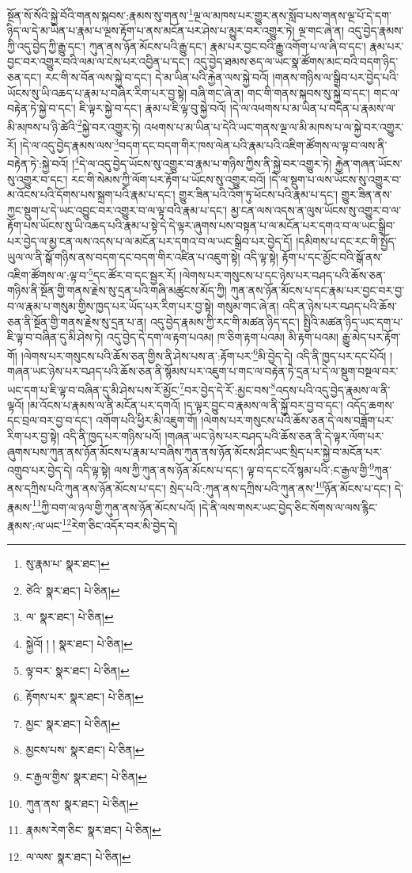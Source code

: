 སྔོན་སོ་སོའི་སྐྱེ་བོའི་གནས་སྐབས་:རྣམས་སུ་གནས་\footnote{སུ་རྣམ་པ་  སྣར་ཐང་། }ལྔ་ལ་མཁས་པར་གྱུར་ནས་སློབ་པས་གནས་ལྔ་པོ་དེ་དག་ཉིད་ལ་དེ་མ་ཡིན་པ་རྣམ་པ་ལྔས་རྟོག་པ་ནས་མངོན་པར་ཤེས་པ་མྱུར་བར་འགྱུར་ཏེ། ལྔ་གང་ཞེ་ན། འདུ་བྱེད་རྣམས་ཀྱི་འདུ་བྱེད་ཀྱི་རྒྱུ་དང་། ཀུན་ནས་ཉོན་མོངས་པའི་རྒྱུ་དང་། རྣམ་པར་བྱང་བའི་རྒྱུ་འགོག་པ་ལ་ཞི་བ་དང་། རྣམ་པར་བྱང་བར་འགྱུར་བའི་ལམ་ལ་ངེས་པར་འབྱིན་པ་དང་། འདུ་བྱེད་ཐམས་ཅད་ལ་ཡང་སྣ་ཚོགས་མང་བའི་བདག་ཉིད་ཅན་དང་། རང་གི་ས་བོན་ལས་སྐྱེ་བ་དང་། དེ་མ་ཡིན་པའི་རྐྱེན་ལས་སྐྱེ་བའོ། །གནས་གཉིས་ལ་སྒྲིབ་པར་བྱེད་པའི་ཡོངས་སུ་ཡི་འཆད་པ་རྣམ་པ་བཞིར་རིག་པར་བྱ་སྟེ། བཞི་གང་ཞེ་ན། གང་གི་གནས་སྐབས་སུ་སྐྱེ་བ་དང་། གང་ལ་བརྟེན་ཏེ་སྐྱེ་བ་དང་། ཇི་ལྟར་སྐྱེ་བ་དང་། རྣམ་པ་ཇི་ལྟ་བུ་སྐྱེ་བའོ། །དེ་ལ་འཕགས་པ་མ་ཡིན་པ་བདེན་པ་རྣམས་ལ་མི་མཁས་པ་ཉི་ཚེའི་\footnote{ཙེའི་  སྣར་ཐང་།  པེ་ཅིན། }སྐྱེ་བར་འགྱུར་ཏེ། འཕགས་པ་མ་ཡིན་པ་དེའི་ཡང་གནས་ལྔ་ལ་མི་མཁས་པ་ལ་སྐྱེ་བར་འགྱུར་རོ། །དེ་ལ་འདུ་བྱེད་རྣམས་ལས་\footnote{ལ་  སྣར་ཐང་།  པེ་ཅིན། }བདག་དང་བདག་གིར་ཁས་ལེན་པའི་རྣམ་པའི་འཇིག་ཚོགས་ལ་ལྟ་བ་ལས་ནི་བརྟེན་ཏེ་:སྐྱེ་བའོ། །\footnote{སྐྱེའོ། ། །  སྣར་ཐང་།  པེ་ཅིན། }དེ་ལ་འདུ་བྱེད་ཡོངས་སུ་འགྱུར་བ་རྣམ་པ་གཉིས་ཀྱིས་ནི་སྐྱེ་བར་འགྱུར་ཏེ། རྐྱེན་གཞན་ཡོངས་སུ་འགྱུར་བ་དང་། རང་གི་སེམས་ཀྱི་ལོག་པར་རྟོག་པ་ཡོངས་སུ་འགྱུར་བའོ། །དེ་ལ་སྡུག་པ་ལས་ཡོངས་སུ་འགྱུར་བ་མ་འོངས་པའི་དོགས་པས་སྐྲག་པའི་རྣམ་པ་དང་། གྱུར་ཟིན་པའི་འོག་ཏུ་ཕོངས་པའི་རྣམ་པ་དང་། གྱུར་ཟིན་ནས་ཀྱང་སྡུག་པ་དེ་ཡང་འབྱུང་བར་འགྱུར་བ་ལ་ལྟ་བའི་རྣམ་པ་དང་། མྱ་ངན་ལས་འདས་ན་ལུས་ཡོངས་སུ་འགྱུར་བ་ལ་རྟོག་པས་ཡོངས་སུ་ཡི་འཆད་པའི་རྣམ་པ་སྟེ་དེ་དེ་ལྟར་ཞུགས་པས་བསྟན་པ་ལ་མངོན་པར་དགའ་བ་ལ་ཡང་སྒྲིབ་པར་བྱེད་ལ་མྱ་ངན་ལས་འདས་པ་ལ་མངོན་པར་དགའ་བ་ལ་ཡང་སྒྲིབ་པར་བྱེད་དོ། །དམིགས་པ་དང་རང་གི་སྤྱོད་ཡུལ་ལ་ནི་སྒོ་གཉིས་ནས་བདག་དང་བདག་གིར་འཛིན་པ་འཇུག་སྟེ། འདི་ལྟ་སྟེ། རྟོག་པ་དང་མྱོང་བའི་སྒོ་ནས་འཇིག་ཚོགས་ལ་:ལྟ་བ་\footnote{ལྟ་བར་  སྣར་ཐང་།  པེ་ཅིན། }དང་ཚོར་བ་དང་སྦྱར་རོ། །ལེགས་པར་གསུངས་པ་དང་ཉེས་པར་བཤད་པའི་ཆོས་ཅན་གཉིས་ནི་སྔོན་གྱི་གནས་རྗེས་སུ་དྲན་པའི་གཞི་མཚུངས་མོད་ཀྱི། ཀུན་ནས་ཉོན་མོངས་པ་དང་རྣམ་པར་བྱང་བར་བྱ་བ་ལ་རྣམ་པ་གསུམ་གྱིས་ཁྱད་པར་ཡོད་པར་རིག་པར་བྱ་སྟེ། གསུམ་གང་ཞེ་ན། འདི་ན་ཉེས་པར་བཤད་པའི་ཆོས་ཅན་ནི་སྔོན་གྱི་གནས་རྗེས་སུ་དྲན་པ་ན། འདུ་བྱེད་རྣམས་ཀྱི་རང་གི་མཚན་ཉིད་དང་། སྤྱིའི་མཚན་ཉིད་ཡང་དག་པ་ཇི་ལྟ་བ་བཞིན་དུ་མི་ཤེས་ཏེ། འདུ་བྱེད་དེ་དག་ལ་རྟག་པའམ། ཁ་ཅིག་རྟག་པའམ། མི་རྟག་པའམ། རྒྱུ་མེད་པར་རྟོག་གོ། །ལེགས་པར་གསུངས་པའི་ཆོས་ཅན་གྱིས་ནི་ཤེས་པས་ན་:རྟོག་པར་\footnote{རྟོགས་པར་  སྣར་ཐང་།  པེ་ཅིན། }མི་བྱེད་དེ། འདི་ནི་ཁྱད་པར་དང་པོའོ། །གཞན་ཡང་ཉེས་པར་བཤད་པའི་ཆོས་ཅན་ནི་སྙོམས་པར་འཇུག་པ་གང་ལ་བརྟེན་ཏེ་དྲན་པ་དེ་ལ་སྡུག་བསྔལ་བར་ཡང་དག་པ་ཇི་ལྟ་བ་བཞིན་དུ་མི་ཤེས་པས་རོ་མྱོང་\footnote{མྱང་  སྣར་ཐང་།  པེ་ཅིན། }བར་བྱེད་དེ་རོ་:མྱང་བས་\footnote{མྱངས་པས་  སྣར་ཐང་།  པེ་ཅིན། }འདས་པའི་འདུ་བྱེད་རྣམས་ལ་ནི་ལྟའོ། །མ་འོངས་པ་རྣམས་ལ་ནི་མངོན་པར་དགའོ། །ད་ལྟར་བྱུང་བ་རྣམས་ལ་ནི་སྐྱོ་བར་བྱ་བ་དང་། འདོད་ཆགས་དང་བྲལ་བར་བྱ་བ་དང་། འགོག་པའི་ཕྱིར་མི་འཇུག་གོ། །ལེགས་པར་གསུངས་པའི་ཆོས་ཅན་དེ་ལས་བཟློག་པར་རིག་པར་བྱ་སྟེ། འདི་ནི་ཁྱད་པར་གཉིས་པའོ། །གཞན་ཡང་ཉེས་པར་བཤད་པའི་ཆོས་ཅན་ནི་དེ་ལྟར་ལོག་པར་ཞུགས་པས་ཀུན་ནས་ཉོན་མོངས་པ་རྣམ་པ་བཞིས་ཀུན་ནས་ཉོན་མོངས་ཤིང་ཡང་སྲིད་པར་སྐྱེ་བ་མངོན་པར་འགྲུབ་པར་བྱེད་དེ། འདི་ལྟ་སྟེ། ལས་ཀྱི་ཀུན་ནས་ཉོན་མོངས་པ་དང་། ལྟ་བ་དང་ངའོ་སྙམ་པའི་:ང་རྒྱལ་གྱི་\footnote{ང་རྒྱལ་གྱིས་  སྣར་ཐང་།  པེ་ཅིན། }ཀུན་ནས་དཀྲིས་པའི་ཀུན་ནས་ཉོན་མོངས་པ་དང་། སྲེད་པའི་:ཀུན་ནས་དཀྲིས་པའི་ཀུན་ནས་\footnote{ཀུན་ནས་  སྣར་ཐང་།  པེ་ཅིན། }ཉོན་མོངས་པ་དང་། དེ་རྣམས་\footnote{རྣམས་རེག་ཅིང་  སྣར་ཐང་།  པེ་ཅིན། }ཀྱི་བག་ལ་ཉལ་གྱི་ཀུན་ནས་ཉོན་མོངས་པའོ། །དེ་ནི་ལས་གསར་ཡང་བྱེད་ཅིང་སོགས་ལ་ལས་རྙིང་རྣམས་:ལ་ཡང་\footnote{ལ་ལས་  སྣར་ཐང་།  པེ་ཅིན། }རེག་ཅིང་འདོར་བར་མི་བྱེད་དེ། 